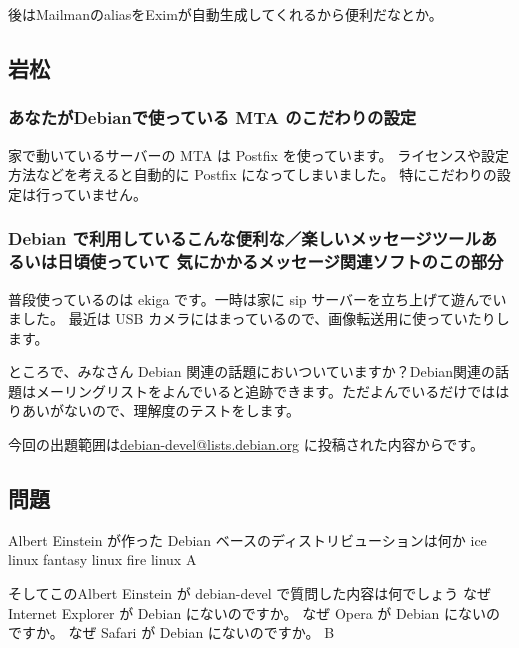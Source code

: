\documentclass[mingoth,a4paper]{jsarticle}
\begin{document}
後はMailmanのaliasをEximが自動生成してくれるから便利だなとか。

\subsection{岩松}

\subsubsection{あなたがDebianで使っている MTA のこだわりの設定}
家で動いているサーバーの MTA は Postfix を使っています。
ライセンスや設定方法などを考えると自動的に Postfix になってしまいました。
特にこだわりの設定は行っていません。

\subsubsection{Debian で利用しているこんな便利な／楽しいメッセージツールあるいは日頃使っていて
気にかかるメッセージ関連ソフトのこの部分}
普段使っているのは ekiga です。一時は家に sip サーバーを立ち上げて遊んでいました。
最近は USB カメラにはまっているので、画像転送用に使っていたりします。


ところで、みなさん Debian 関連の話題においついていますか？Debian関連の話
題はメーリングリストをよんでいると追跡できます。ただよんでいるだけではは
りあいがないので、理解度のテストをします。

今回の出題範囲は\url{debian-devel@lists.debian.org} に投稿された内容からです。

\subsection{問題}

\santaku
{Albert Einstein が作った Debian ベースのディストリビューションは何か}
{ice linux}
{fantasy linux}
{fire linux}
{A}

\santaku
{そしてこのAlbert Einstein が debian-devel で質問した内容は何でしょう}
{なぜ Internet Explorer が Debian にないのですか。}
{なぜ Opera が Debian にないのですか。}
{なぜ Safari が Debian にないのですか。}
{B}
\end{document}
